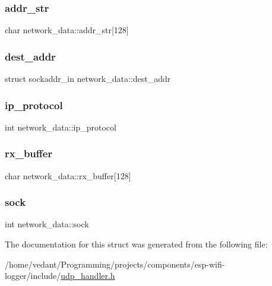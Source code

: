\subsubsection{\texorpdfstring{addr\+\_\+str}{addr\_str}}
{\footnotesize\ttfamily char network\+\_\+data\+::addr\+\_\+str\mbox{[}128\mbox{]}}

\mbox{\label{structnetwork__data_a553d72b8506e9098215451adffd330d4}} 
\subsubsection{\texorpdfstring{dest\+\_\+addr}{dest\_addr}}
{\footnotesize\ttfamily struct sockaddr\+\_\+in network\+\_\+data\+::dest\+\_\+addr}

\mbox{\label{structnetwork__data_a2e35f88440947101eeeb8dc91a43d5e5}} 
\subsubsection{\texorpdfstring{ip\+\_\+protocol}{ip\_protocol}}
{\footnotesize\ttfamily int network\+\_\+data\+::ip\+\_\+protocol}

\mbox{\label{structnetwork__data_a9346e7a82edd41c346d1528ef301469b}} 
\subsubsection{\texorpdfstring{rx\+\_\+buffer}{rx\_buffer}}
{\footnotesize\ttfamily char network\+\_\+data\+::rx\+\_\+buffer\mbox{[}128\mbox{]}}

\mbox{\label{structnetwork__data_ab056807bd5bb97ce18f27e6b233de0b3}} 
\subsubsection{\texorpdfstring{sock}{sock}}
{\footnotesize\ttfamily int network\+\_\+data\+::sock}



The documentation for this struct was generated from the following file\+:\begin{DoxyCompactItemize}
\item 
/home/vedant/\+Programming/projects/components/esp-\/wifi-\/logger/include/\hyperlink{udp__handler_8h}{udp\+\_\+handler.\+h}\end{DoxyCompactItemize}
